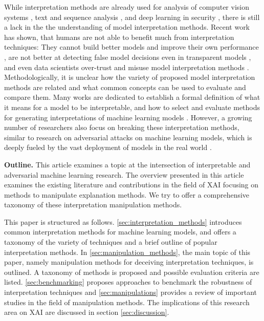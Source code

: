 \documentclass[sigconf]{acmart}
\newcommand{\mypar}[1]{\vspace{0.2cm}\noindent\textbf{#1}}
\begin{document}
While interpretation methods are already used for analysis of computer vision systems \cite{bach2015pixel, simonyan2013deep, zeiler2014visualizing}, text and sequence analysis \cite{ancona2017towards, arras2017relevant}, and deep learning in security \cite{evaluating_explanations_security}, there is still a lack in the the understanding of model interpretation methods. 
Recent work has shown, that humans are not able to benefit much from interpretation techniques: They cannot build better models and improve their own performance \cite{hase2020evaluating}, are not better at detecting false model decisions even in transparent models \cite{poursabzi2018manipulating}, and even data scientists over-trust and misuse model interpretation methods \cite{kaur2020interpreting}. 
Methodologically, it is unclear how the variety of proposed model interpretation methods are related and what common concepts can be used to evaluate and compare them. Many works are dedicated to establish a formal definition of what it means for a model to be interpretable, and how to select and evaluate methods for generating interpretations of machine learning models \cite{murdoch2019definitions, lipton2018mythos}. However, a growing number of researchers also focus on breaking these interpretation methods, similar to research on adversarial attacks on machine learning models, which is deeply fueled by the vast deployment of models in the real world \cite{fooling_nn_interpreters,ghorbani2019interpretation,dimanov2020you,dombrowski2019explanations,advlime_aies20, le2020remote, zhang2020interpretable, kuppa2020black, anders2020fairwashing, lakkaraju2020fool, kindermans2017reliability}.

\mypar{Outline.}\newline
This article examines a topic at the intersection of interpretable and adversarial machine learning research. 
The overview presented in this article examines the existing literature and contributions in the field of XAI focusing on methods to manipulate explanation methods. We try to offer a comprehensive taxonomy of these interpretation manipulation methods. 

This paper is structured as follows. \autoref{sec:interpretation_methods} introduces common interpretation methods for machine learning models, and offers a taxonomy of the variety of techniques and a brief outline of popular interpretation methods.
In \autoref{sec:manipulation_methods}, the main topic of this paper, namely manipulation methods for deceiving interpretation techniques, is outlined. A taxonomy of methods is proposed and possible evaluation criteria are listed. \autoref{sec:benchmarking} proposes approaches to benchmark the robustness of interpretation techniques and \autoref{sec:manipulations} provides a review of important studies in the field of manipulation methods. The implications of this research area on XAI are discussed in section \autoref{sec:discussion}.
\end{document}
